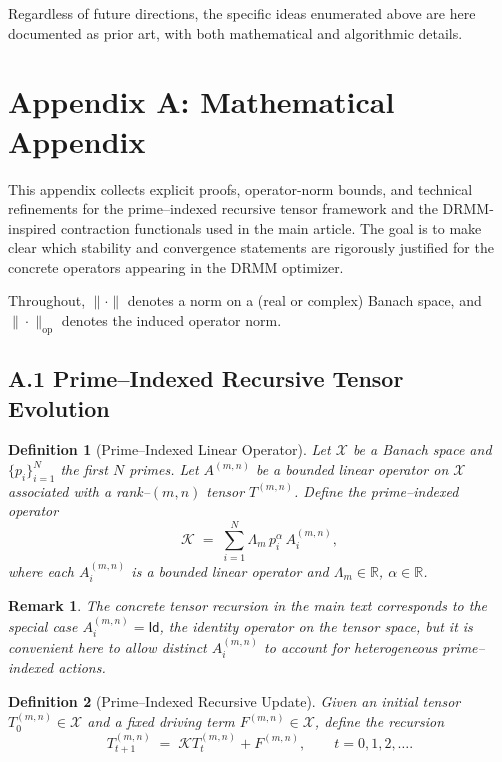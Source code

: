 \documentclass[11pt]{article}
\newtheorem{definition}{Definition}
\newtheorem{remark}{Remark}
\begin{document}
Regardless of future directions, the specific ideas enumerated above are here documented as prior art, with both mathematical and algorithmic details.

\section*{Appendix A: Mathematical Appendix}


This appendix collects explicit proofs, operator-norm bounds, and technical refinements for the prime–indexed recursive tensor framework and the DRMM-inspired contraction functionals used in the main article. The goal is to make clear which stability and convergence statements are rigorously justified for the concrete operators appearing in the DRMM optimizer.

Throughout, $\|\cdot\|$ denotes a norm on a (real or complex) Banach space, and $\|\cdot\|_{\mathrm{op}}$ denotes the induced operator norm.

\subsection*{A.1 Prime–Indexed Recursive Tensor Evolution}

\begin{definition}[Prime–Indexed Linear Operator]
Let $\mathcal{X}$ be a Banach space and $\{p_i\}_{i=1}^N$ the first $N$ primes. Let $A^{(m,n)}$ be a bounded linear operator on $\mathcal{X}$ associated with a rank–$(m,n)$ tensor $T^{(m,n)}$. Define the prime–indexed operator
\begin{equation}
  \mathcal{K}
  \;=\;
  \sum_{i=1}^N \Lambda_m\, p_i^{\alpha}\, A^{(m,n)}_i,
  \label{eq:K-def}
\end{equation}
where each $A^{(m,n)}_i$ is a bounded linear operator and $\Lambda_m \in \mathbb{R}$, $\alpha \in \mathbb{R}$.
\end{definition}

\begin{remark}
The concrete tensor recursion in the main text corresponds to the special case $A^{(m,n)}_i = \mathsf{Id}$, the identity operator on the tensor space, but it is convenient here to allow distinct $A^{(m,n)}_i$ to account for heterogeneous prime–indexed actions.
\end{remark}

\begin{definition}[Prime–Indexed Recursive Update]
Given an initial tensor $T_0^{(m,n)} \in \mathcal{X}$ and a fixed driving term $F^{(m,n)} \in \mathcal{X}$, define the recursion
\begin{equation}
  T_{t+1}^{(m,n)}
  \;=\;
  \mathcal{K} T_t^{(m,n)} + F^{(m,n)},
  \qquad t = 0,1,2,\dots.
  \label{eq:tensor-recursion-op}
\end{equation}
\end{definition}
\end{document}
